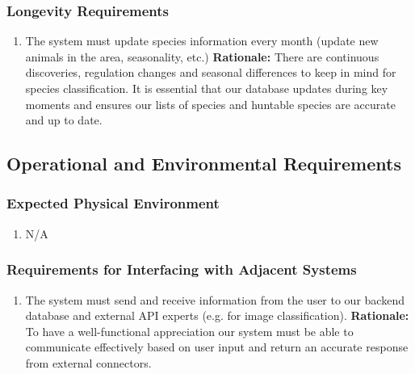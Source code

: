 \documentclass[]{article}
\begin{document}
\subsubsection{Longevity Requirements}
\label{ssub:longevity_requirements}
\begin{enumerate}[{PR-L}1. ]
	\item The system must update species information every month (update new animals in the area, seasonality, etc.)
	\newline \textbf{Rationale:} There are continuous discoveries, regulation changes and seasonal differences to keep in mind for species classification. It is essential that our database updates during key moments and ensures our lists of species and huntable species are accurate and up to date. 
\end{enumerate}


\subsection{Operational and Environmental Requirements}
\label{sub:operational_and_environmental_requirements}

\subsubsection{Expected Physical Environment}
\label{ssub:expected_physical_environment}
\begin{enumerate}[{OE-EPE}1. ]
	\item N/A
\end{enumerate}

\subsubsection{Requirements for Interfacing with Adjacent Systems}
\label{ssub:requirements_for_interfacing_with_adjacent_systems}
\begin{enumerate}[{OE-IA}1. ]
	\item The system must send and receive information from the user to our backend database and external API experts (e.g. for image classification).
	\newline \textbf{Rationale: }To have a well-functional appreciation our system must be able to communicate effectively based on user input and return an accurate response from external connectors. 
\end{enumerate}
\end{document}
